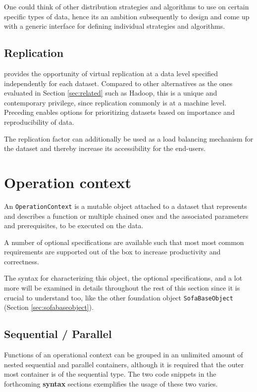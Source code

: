 One could think of other distribution strategies and algorithms to use on certain specific types of data, hence its an ambition subsequently to design and come up with a generic interface for defining individual strategies and algorithms.

\subsection{Replication}
\CodeName provides the opportunity of virtual replication at a data level speci\-fied independently for each dataset. Compared to other alternatives as the ones evaluated in Section \ref{sec:related} such as Hadoop, this is a unique and contemporary privilege, since replication commonly is at a machine level. Preceding enables options for prioritizing datasets based on importance and reproducibility of data.
\newline

The replication factor can additionally be used as a load balancing mechanism for the dataset and thereby increase its accessibility for the end-users.

\section{Operation context} \label{sec:operation}
An \texttt{OperationContext} is a mutable object attached to a dataset that represents and describes a function or multiple chained ones and the associated parameters and prerequisites, to be executed on the data. 

A number of optional specifications are available such that most most common requirements are supported out of the box to increase productivity and correctness.
\newline

The syntax for characterizing this object, the optional specifications, and a lot more will be examined in details throughout the rest of this section since it is crucial to understand too, like the other foundation object \texttt{SofaBaseObject} (Section \ref{sec:sofabaseobject}).

\subsection{Sequential / Parallel}
Functions of an operational context can be grouped in an unlimited amount of nested sequential and parallel containers, although it is required that the outer most container is of the sequential type. The two code snippets in the forthcoming \textbf{syntax} sections exemplifies the usage of these two varies.

